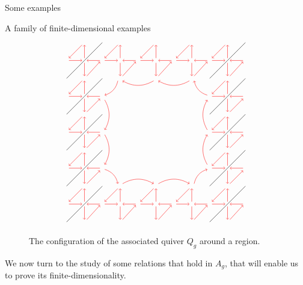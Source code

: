\begin{chapter}{Some examples}
\begin{section}{A family of finite-dimensional examples}
\begin{figure}[h]
\[\begin{tikzpicture}
\foreach \x in {-6.75,-5.25,...,0.25}
{
\draw (-3.75, \x) -- (-2.25, \x+1.5);
\draw (3.75, \x+1.5) -- (2.25, \x);
}

\foreach \x in {-3.75,-2.25,...,2.25}
{
\draw[->, red] (\x+0.85, -0.65) -- (\x+1.4, -0.05);
\draw[->, red] (\x+1.4, 0) -- (\x+0.85, 0);
\draw[->, red] (\x+0.75, -0.1) -- (\x+0.75, -0.65);
\draw[->, red] (\x+0.85, -6.65) -- (\x+1.4, -6.05);
\draw[->, red] (\x+1.4, -6) -- (\x+0.85, -6);
\draw[->, red] (\x+0.75, -6.1) -- (\x+0.75, -6.65);

\draw[->, red] (\x+0.75, 0.1) -- (\x+0.75, 0.65);
\draw[->, red] (\x+0.65, 0.65) -- (\x+0.1, 0.1);
\draw[->, red] (\x+0.1, 0) -- (\x+0.65, 0);
\draw[->, red] (\x+0.75, -5.9) -- (\x+0.75, -5.35);
\draw[->, red] (\x+0.65, -5.35) -- (\x+0.1, -5.9);
\draw[->, red] (\x+0.1, -6) -- (\x+0.65, -6);
}

\foreach \x in {-0.75,-2.25,-3.75}
{
\draw[->, red] (-2.35, \x-0.75) -- (-2.9, \x-0.75);
\draw[->, red] (-3, \x-0.85) -- (-3, \x-1.4);
\draw[->, red] (-2.9, \x-1.4) -- (-2.35, \x-0.85);
\draw[->, red] (3.65, \x-0.75) -- (3.1, \x-0.75);
\draw[->, red] (3, \x-0.85) -- (3, \x-1.4);
\draw[->, red] (3.1, \x-1.4) -- (3.65, \x-0.85);

\draw[->, red] (-3, \x-0.65) -- (-3, \x-0.1);
\draw[->, red] (-3.1, \x-0.1) -- (-3.65, \x-0.65);
\draw[->, red] (-3.65, \x-0.75) -- (-3.1, \x-0.75);
\draw[->, red] (3, \x-0.65) -- (3, \x-0.1);
\draw[->, red] (2.9, \x-0.1) -- (2.35, \x-0.65);
\draw[->, red] (2.35, \x-0.75) -- (2.9, \x-0.75);
}

\draw[<-, red] (-1.4, -0.85) to [bend right] (-0.1, -0.85);
\draw[<-, red] (0.1, -0.85) to [bend right] (1.4, -0.85);
\draw[->,  red] (-1.4, -5.15) to [bend left] (-0.1, -5.15);
\draw[->, red] (0.1, -5.15) to [bend left] (1.4, -5.15);

\draw[->, red] (-2.15, -1.65) to [bend left] (-2.15, -2.9);
\draw[->, red] (-2.15, -3.1) to [bend left] (-2.15, -4.35);
\draw[<-, red] (2.15, -1.65) to [bend right] (2.15, -2.9);
\draw[<-, red] (2.15, -3.1) to [bend right] (2.15, -4.35);

\draw[->, red] (-1.6, -0.85) to [bend left] (-2.15, -1.45);
\draw[->, red] (-2.15, -4.55) to [bend left] (-1.6, -5.15);
\draw[<-, red] (1.6, -0.85) to [bend right] (2.15, -1.45);
\draw[<-, red] (2.15, -4.55) to [bend right] (1.6, -5.15);
\end{tikzpicture}
\]
\caption{The configuration of the associated quiver $Q_g$ around a region.}
\end{figure}
We now turn to the study of some relations that hold in $A_g$, that will enable us to prove its finite-dimensionality.


\end{section}
\end{chapter}
